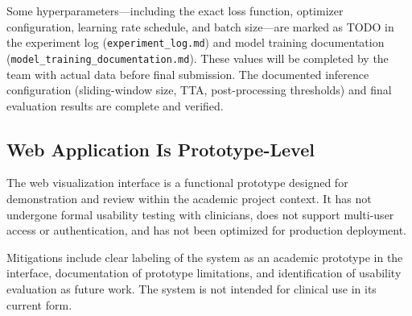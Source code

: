 Some hyperparameters---including the exact loss function, optimizer configuration, learning rate schedule, and batch size---are marked as TODO in the experiment log (\texttt{experiment\_log.md}) and model training documentation (\texttt{model\_training\_documentation.md}). These values will be completed by the team with actual data before final submission. The documented inference configuration (sliding-window size, TTA, post-processing thresholds) and final evaluation results are complete and verified.

\subsection{Web Application Is Prototype-Level}

The web visualization interface is a functional prototype designed for demonstration and review within the academic project context. It has not undergone formal usability testing with clinicians, does not support multi-user access or authentication, and has not been optimized for production deployment. 

Mitigations include clear labeling of the system as an academic prototype in the interface, documentation of prototype limitations, and identification of usability evaluation as future work. The system is not intended for clinical use in its current form.
